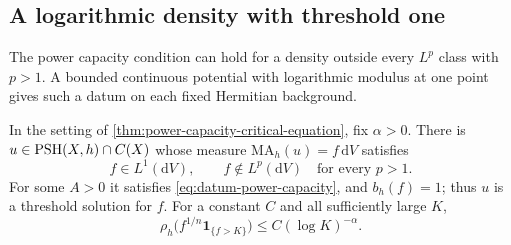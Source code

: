 \subsection{A logarithmic density with threshold one}
\label{subsec:logarithmic-critical-density}

The power capacity condition can hold for a density outside every $L^p$ class with $p>1$. A bounded continuous potential with logarithmic modulus at one point gives such a datum on each fixed Hermitian background.

\begin{theorem}\label{thm:logarithmic-critical-density}
In the setting of \cref{thm:power-capacity-critical-equation}, fix $\alpha>0$. There is $u\in\mathrm{PSH}(X,h)\cap C(X)$ whose measure $\mathrm{MA}_h(u)=f\,\mathrm dV$ satisfies
\[
 f\in L^1(\mathrm dV),\qquad
 f\notin L^p(\mathrm dV)\quad\text{for every }p>1.
\]
For some $A>0$ it satisfies \eqref{eq:datum-power-capacity}, and $b_h(f)=1$; thus $u$ is a threshold solution for $f$. For a constant $C$ and all sufficiently large $K$,
\begin{equation}\label{eq:logarithmic-root-tail}
 \rho_h\bigl(f^{1/n}\mathbf1_{\{f>K\}}\bigr)
       \leq C(\log K)^{-\alpha}.
\end{equation}
\end{theorem}
